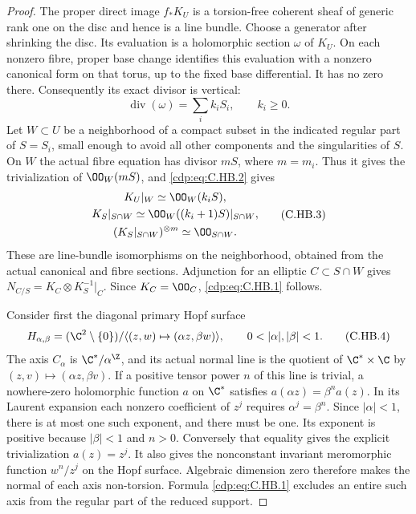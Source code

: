 \begin{proof}
The proper direct image $f_*K_U$ is a
torsion-free coherent sheaf of generic rank
one on the disc and hence is a line bundle.
Choose a generator after shrinking the disc.
Its evaluation is a holomorphic section
$\omega$ of $K_U$. On each nonzero fibre,
proper base change identifies this evaluation
with a nonzero canonical form on that torus,
up to the fixed base differential. It has
no zero there. Consequently its exact divisor
is vertical:
\[
                   \operatorname{div}(\omega)
                               =\sum_i k_iS_i,
                        \qquad k_i\ge0.              \tag{C.HB.2}\label{cdp:eq:C.HB.2}
\]
Let $W\subset U$ be a neighborhood of a
compact subset in the indicated regular
part of $S=S_i$, small enough to avoid all
other components and the singularities of
$S$. On $W$ the actual fibre equation has
divisor $mS$, where $m=m_i$. Thus it gives
the trivialization of $\OO_W(mS)$, and
\eqref{cdp:eq:C.HB.2} gives
\[
 \begin{gathered}
 K_U|_W\simeq\OO_W(k_iS),\\
 K_S|_{S\cap W}\simeq
                  \OO_W((k_i+1)S)|_{S\cap W},\\
 (K_S|_{S\cap W})^{\otimes m}\simeq\OO_{S\cap W}.
 \end{gathered}
                                                               \tag{C.HB.3}\label{cdp:eq:C.HB.3}
\]
These are line-bundle isomorphisms on the
neighborhood, obtained from the actual
canonical and fibre sections. Adjunction
for an elliptic $C\subset S\cap W$ gives
$N_{C/S}=K_C\otimes K_S^{-1}|_C$.
Since $K_C=\OO_C$, \eqref{cdp:eq:C.HB.1} follows.

Consider first the diagonal primary
Hopf surface
\[
 H_{\alpha,\beta}=(\C^2\setminus\{0\})/
       \langle(z,w)\mapsto(\alpha z,\beta w)\rangle,
                    \qquad0<|\alpha|,|\beta|<1.
                                                               \tag{C.HB.4}\label{cdp:eq:C.HB.4}
\]
The axis $C_\alpha$ is $\C^*/\alpha^{\Z}$,
and its actual normal line is the quotient
of $\C^*\times\C$ by
$(z,v)\mapsto(\alpha z,\beta v)$.
If a positive tensor power $n$ of this
line is trivial, a nowhere-zero holomorphic
function $a$ on $\C^*$ satisfies
$a(\alpha z)=\beta^n a(z)$.
In its Laurent expansion each nonzero
coefficient of $z^j$ requires
$\alpha^j=\beta^n$. Since $|\alpha|<1$,
there is at most one such exponent, and
there must be one. Its exponent is positive
because $|\beta|<1$ and $n>0$.
Conversely that equality gives the
explicit trivialization $a(z)=z^j$.
It also gives the nonconstant invariant
meromorphic function $w^n/z^j$ on the
Hopf surface. Algebraic dimension zero
therefore makes the normal of each axis
non-torsion. Formula \eqref{cdp:eq:C.HB.1} excludes
an entire such axis from the regular
part of the reduced support.


\end{proof}
